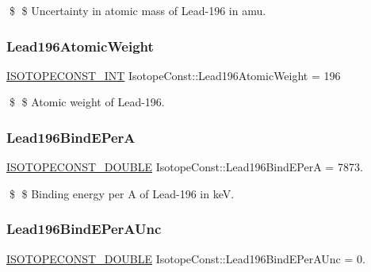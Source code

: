 \$ \$ Uncertainty in atomic mass of Lead-\/196 in amu. \mbox{\label{group___isotope_const-_lead-_pb196_ga0564653cdb4b51acf664f7c7c54a17eb}} 
\subsubsection{\texorpdfstring{Lead196\+Atomic\+Weight}{Lead196AtomicWeight}}
{\footnotesize\ttfamily \mbox{\hyperlink{group___isotope_const-_macros_ga5f18360b3e99483a35c32d789e62621c}{I\+S\+O\+T\+O\+P\+E\+C\+O\+N\+S\+T\+\_\+\+I\+NT}} Isotope\+Const\+::\+Lead196\+Atomic\+Weight = 196}

\$ \$ Atomic weight of Lead-\/196. \mbox{\label{group___isotope_const-_lead-_pb196_ga254f7c802b865834d9b2b415e7891dbf}} 
\subsubsection{\texorpdfstring{Lead196\+Bind\+E\+PerA}{Lead196BindEPerA}}
{\footnotesize\ttfamily \mbox{\hyperlink{group___isotope_const-_macros_ga8f45a7272ce02c0b4c65c44636ed719a}{I\+S\+O\+T\+O\+P\+E\+C\+O\+N\+S\+T\+\_\+\+D\+O\+U\+B\+LE}} Isotope\+Const\+::\+Lead196\+Bind\+E\+PerA = 7873.}

\$ \$ Binding energy per A of Lead-\/196 in keV. \mbox{\label{group___isotope_const-_lead-_pb196_ga12900482a016aec83d8324329496eb39}} 
\subsubsection{\texorpdfstring{Lead196\+Bind\+E\+Per\+A\+Unc}{Lead196BindEPerAUnc}}
{\footnotesize\ttfamily \mbox{\hyperlink{group___isotope_const-_macros_ga8f45a7272ce02c0b4c65c44636ed719a}{I\+S\+O\+T\+O\+P\+E\+C\+O\+N\+S\+T\+\_\+\+D\+O\+U\+B\+LE}} Isotope\+Const\+::\+Lead196\+Bind\+E\+Per\+A\+Unc = 0.}


